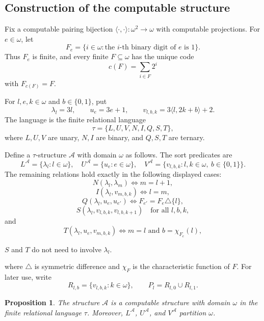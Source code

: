 \documentclass[12pt]{article}
\newtheorem{proposition}[theorem]{Proposition}
\theoremstyle{definition}
\theoremstyle{remark}
\newcommand{\review}[1]{\begin{reviewbox}#1\end{reviewbox}}
\begin{document}
\subsection{Construction of the computable structure}\label{sec:construction}

Fix a computable pairing bijection \(\langle\cdot,\cdot\rangle:\omega^2\to\omega\) with computable projections.  For \(e\in\omega\), let
\[
F_e=\{i\in\omega:\text{the \(i\)-th binary digit of \(e\) is \(1\)}\}.
\]
Thus \(F_e\) is finite, and every finite \(F\subseteq\omega\) has the unique code
\[
c(F)=\sum_{i\in F}2^i
\]
with \(F_{c(F)}=F\).

For \(l,e,k\in\omega\) and \(b\in\{0,1\}\), put
\[
\lambda_l=3l,\qquad u_e=3e+1,\qquad v_{l,b,k}=3\langle l,2k+b\rangle+2.
\]
The language is the finite relational language
\[
\tau=\{L,U,V,N,I,Q,S,T\},
\]
where \(L,U,V\) are unary, \(N,I\) are binary, and \(Q,S,T\) are ternary.

Define a \(\tau\)-structure \(\mathcal A\) with domain \(\omega\) as follows.  The sort predicates are
\[
L^{\mathcal A}=\{\lambda_l:l\in\omega\},\quad
U^{\mathcal A}=\{u_e:e\in\omega\},\quad
V^{\mathcal A}=\{v_{l,b,k}:l,k\in\omega,\ b\in\{0,1\}\}.
\]
The remaining relations hold exactly in the following displayed cases:
\[
N(\lambda_l,\lambda_m)\Longleftrightarrow m=l+1,
\]
\[
I(\lambda_l,v_{m,b,k})\Longleftrightarrow l=m,
\]
\[
Q(\lambda_l,u_e,u_{e'})\Longleftrightarrow F_{e'}=F_e\triangle\{l\},
\]
\[
S(\lambda_l,v_{l,b,k},v_{l,b,k+1})
\quad\text{for all }l,b,k,
\]
and
\[
T(\lambda_l,u_e,v_{m,b,k})
\Longleftrightarrow
m=l\text{ and }b=\chi_{F_e}(l),
\]
\review{$S$ and $T$ do not need to involve $\lambda_l$.}
where \(\triangle\) is symmetric difference and \(\chi_F\) is the characteristic function of \(F\).  For later use, write
\[
R_{l,b}=\{v_{l,b,k}:k\in\omega\},
\qquad
P_l=R_{l,0}\cup R_{l,1}.
\]

\begin{proposition}\label{prop:construction}
The structure \(\mathcal A\) is a computable structure with domain \(\omega\) in the finite relational language \(\tau\).  Moreover, \(L^{\mathcal A}\), \(U^{\mathcal A}\), and \(V^{\mathcal A}\) partition \(\omega\).
\end{proposition}
\end{document}
